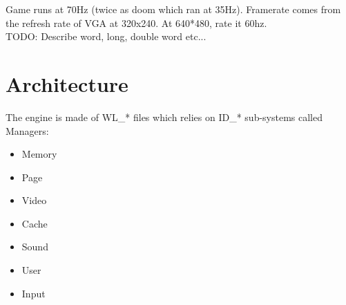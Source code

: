 \documentclass[book.tex]{subfiles}
\begin{document}
Game runs at 70Hz (twice as doom which ran at 35Hz). Framerate comes from the refresh rate of VGA at 320x240. At 640*480, rate it 60hz.\\
TODO: Describe word, long, double word etc...
\par
\begin{minipage}{\textwidth}

\end{minipage}\par
\begin{minipage}{\textwidth}

\end{minipage}\par
\begin{minipage}{\textwidth}

\end{minipage}\par
\begin{minipage}{\textwidth}

\end{minipage}\par
\begin{minipage}{\textwidth}

\end{minipage}
\par

















\section{Architecture}

The engine is made of WL\_* files which relies on ID\_* sub-systems called Managers:
\begin{itemize}
	\item Memory
	\item Page
	\item Video
	\item Cache
	\item Sound
	\item User
	\item Input
\end{itemize}
\end{document}
